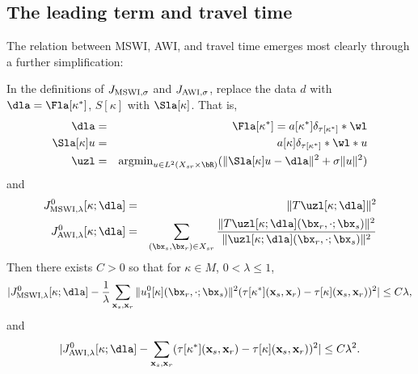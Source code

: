 \subsection{The leading term and travel time}

The relation between MSWI, AWI, and travel time emerges most clearly
through a further simplification:

\begin{prop} 
In the definitions of $J_{\rm MSWI,\sigma}$ and $J_{\rm AWI,\sigma}$, replace the data $d$ with
$\dla = \Fla[\kappa^*]$, $S[\kappa]$ with $\Sla[\kappa]$. That is,
\begin{eqnarray}
  \label{eqn:leading}
  \dla & = & \Fla[\kappa^*] = a[\kappa^*]\delta_{\tau[\kappa^*]}*\wl
             \nonumber \\
  \Sla[\kappa]u &=& a[\kappa]\delta_{\tau[\kappa^*]}*\wl *u\nonumber \\
  \uzl &=& \mbox{argmin}_{u \in L^2(X_{sr} \times \bR)} (\|\Sla[\kappa]u-\dla\|^2 + \sigma\|u\|^2)
\end{eqnarray}
and
\begin{eqnarray}
  \label{eqn:awileading}
  J^0_{\rm MSWI,\lambda}[\kappa;\dla] & = &
                                         \|T\uzl[\kappa;\dla]\|^2\nonumber\\
  J^0_{\rm AWI,\lambda}[\kappa;\dla] & = &
                                       \sum_{(\bx_s,\bx_r) \in X_{sr}} \frac{\|T\uzl[\kappa;\dla](\bx_r,\cdot;\bx_s)\|^2}{\|\uzl[\kappa;\dla](\bx_r,\cdot;\bx_s)\|^2}
\end{eqnarray}                 
Then there exists $C>0$ so that for
$\kappa \in M$, $0 < \lambda \le 1$, 
\begin{equation}
  \label{eqn:mswitt}
 | J^0_{\rm MSWI,\lambda}[\kappa;\dla] - 
  \frac{1}{\lambda} \sum_{{\bf x}_s,{\bf x}_r} \|u^0_1[\kappa](\bx_r,\cdot;\bx_s)\|^2(\tau[\kappa^*]({\bf
  x}_s,{\bf x}_r)-\tau[\kappa]({\bf x}_s,{\bf x}_r))^2 | \le C\lambda,
\end{equation}
and
\begin{equation}
  \label{eqn:awitt}
|J^0_{\rm AWI,\lambda}[\kappa;\dla] - \sum_{{\bf x}_s,{\bf x}_r} (\tau[\kappa^*]({\bf
  x}_s,{\bf x}_r)-\tau[\kappa]({\bf x}_s,{\bf x}_r))^2|  \le C\lambda^2.
\end{equation}
\end{prop}


